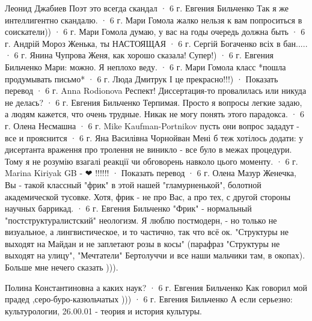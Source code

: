 Леонид Джабиев
Поэт это всегда скандал
 · 6 г.
Евгения Бильченко
Так я же интеллигентно скандалю.
 · 6 г.
Мари Гомола
жалко нельзя к вам попроситься в соискатели))
 · 6 г.
Мари Гомола
думаю, у вас на годы очередь должна быть
 · 6 г.
Андрій Мороз
Женька, ты НАСТОЯЩАЯ
 · 6 г.
Сергій Богаченко
всіх в бан.....
 · 6 г.
Янина Чупрова
Женя, как хорошо сказала! Супер!)
 · 6 г.
Евгения Бильченко
Мари: можно. Я неплохо веду.
 · 6 г.
Мари Гомола
класс *пошла продумывать письмо*
 · 6 г.
Люда Дмитрук
І це прекрасно!!!)
 · Показать перевод · 6 г.
Anna Rodionova
Респект! Диссертация-то провалилась или никуда не делась?
 · 6 г.
Евгения Бильченко
Терпимая. Просто я вопросы легкие задаю, а людям кажется, что очень трудные. Никак не могу понять этого парадокса.
 · 6 г.
Олена Несмашна
 · 6 г.
Mike Kaufman-Portnikov
пусть они вопрос зададут - все и прояснится
 · 6 г.
Яна Василівна Чорнойван
Мені б теж хотілось додати: у дисертанта враження про тролення не виникло - все було в межах процедури. Тому я не розумію взагалі реакції чи обговорень навколо цього моменту.
 · 6 г.
Marina Kiriyak
GB - ❤ !!!!!!
 · Показать перевод · 6 г.
Олена Мазур
Женечка, Вы - такой классный "фрик" в этой нашей "гламурненькой", болотной академической тусовке. Хотя, фрик - не про Вас, а про тех, с другой стороны научных баррикад.
 · 6 г.
Евгения Бильченко
"Фрик" - нормальный "постструктуралистский" неологизм. Я люблю постмодерн, - но только не визуальное, а лингвистическое, и то частично, так что всё ок. "Структуры не выходят на Майдан и не заплетают розы в косы" (парафраз "Структуры не выходят на улицу", "Мечтатели" Бертолуччи и все наши мальчики там, в окопах). Больше мне нечего сказать ))).

Полина Константиновна
а каких наук?
 · 6 г.
Евгения Бильченко
Как говорил мой прадед ,серо-буро-казюльчатых )))
 · 6 г.
Евгения Бильченко
А если серьезно: культурологии, 26.00.01 - теория и история культуры.
